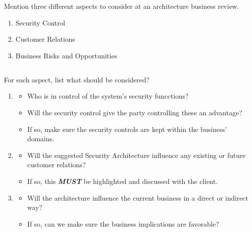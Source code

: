 \begin{questions}
\question{} Mention three different aspects to consider at an architecture business review.
  \begin{solution}
    \begin{enumerate}[noitemsep]
    \item Security Control
    \item Customer Relations
    \item Business Risks and Opportunities
    \end{enumerate}
  \end{solution}

  \begin{parts}
  \part{} For each aspect, list what should be considered?
    \begin{solution}
      \begin{enumerate}[noitemsep]
      \item
        \begin{itemize}[noitemsep]
        \item Who is in control of the system's security funcctions?
        \item Will the security control give the party controlling these an advantage?
        \item If so, make sure the security controls are kept within the business' domains.
        \end{itemize}
      \item
        \begin{itemize}[noitemsep]
        \item Will the suggested Security Architecture influence any existing or future customer relations?
        \item If so, this \emph{\textbf{MUST}} be highlighted and discussed with the client.
        \end{itemize}
      \item
        \begin{itemize}[noitemsep]
        \item Will the architecture influence the current business in a direct or indirect way?
        \item If so, can we make sure the business implications are favorable?
        \end{itemize}
      \end{enumerate}
    \end{solution}
  \end{parts}


\end{questions}
